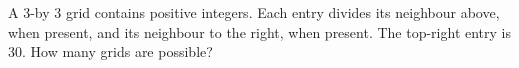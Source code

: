 A 3-by 3 grid contains positive integers. Each entry divides its neighbour above, when present, and its neighbour to the right, when present. The top-right entry is 30. How many grids are possible?
